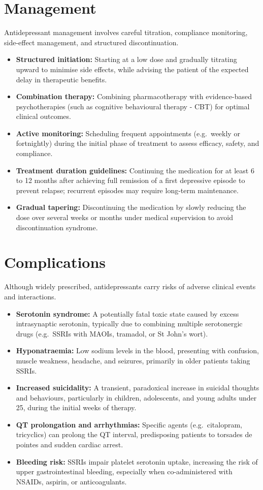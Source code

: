 \section*{Management}
Antidepressant management involves careful titration, compliance monitoring, side-effect management, and structured discontinuation.
\begin{itemize}
    \item \textbf{Structured initiation:} Starting at a low dose and gradually titrating upward to minimise side effects, while advising the patient of the expected delay in therapeutic benefits.
    \item \textbf{Combination therapy:} Combining pharmacotherapy with evidence-based psychotherapies (such as cognitive behavioural therapy - CBT) for optimal clinical outcomes.
    \item \textbf{Active monitoring:} Scheduling frequent appointments (e.g.\ weekly or fortnightly) during the initial phase of treatment to assess efficacy, safety, and compliance.
    \item \textbf{Treatment duration guidelines:} Continuing the medication for at least 6 to 12 months after achieving full remission of a first depressive episode to prevent relapse; recurrent episodes may require long-term maintenance.
    \item \textbf{Gradual tapering:} Discontinuing the medication by slowly reducing the dose over several weeks or months under medical supervision to avoid discontinuation syndrome.
\end{itemize}

\section*{Complications}
Although widely prescribed, antidepressants carry risks of adverse clinical events and interactions.
\begin{itemize}
    \item \textbf{Serotonin syndrome:} A potentially fatal toxic state caused by excess intrasynaptic serotonin, typically due to combining multiple serotonergic drugs (e.g.\ SSRIs with MAOIs, tramadol, or St John's wort).
    \item \textbf{Hyponatraemia:} Low sodium levels in the blood, presenting with confusion, muscle weakness, headache, and seizures, primarily in older patients taking SSRIs.
    \item \textbf{Increased suicidality:} A transient, paradoxical increase in suicidal thoughts and behaviours, particularly in children, adolescents, and young adults under 25, during the initial weeks of therapy.
    \item \textbf{QT prolongation and arrhythmias:} Specific agents (e.g.\ citalopram, tricyclics) can prolong the QT interval, predisposing patients to torsades de pointes and sudden cardiac arrest.
    \item \textbf{Bleeding risk:} SSRIs impair platelet serotonin uptake, increasing the risk of upper gastrointestinal bleeding, especially when co-administered with NSAIDs, aspirin, or anticoagulants.
\end{itemize}

